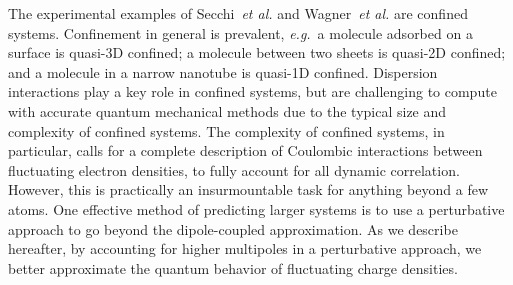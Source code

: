 \documentclass[aps,prl,groupaddress, twocolumn]{revtex4-1}  %
\begin{document}
The experimental examples of Secchi~\textit{et al.} and Wagner~\textit{et al.} are confined systems. Confinement in general is prevalent, \textit{e.g.}\ a molecule adsorbed on a surface is quasi-3D confined; a molecule between two sheets is quasi-2D confined; and a molecule in a narrow nanotube is quasi-1D confined. Dispersion interactions play a key role in confined systems, but are challenging to compute with accurate quantum mechanical methods due to the typical size and complexity of confined systems. The complexity of confined systems, in particular, calls for a complete description of Coulombic interactions between fluctuating electron densities, to fully account for all dynamic correlation. However, this is practically an insurmountable task for anything beyond a few atoms. One effective method of predicting larger systems is to use a perturbative approach to go beyond the dipole-coupled approximation. As we describe hereafter, by accounting for higher multipoles in a perturbative approach, we better approximate the quantum behavior of fluctuating charge densities.
\end{document}
